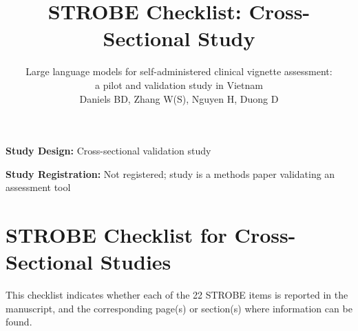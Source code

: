 \documentclass{article}
\title{STROBE Checklist: Cross-Sectional Study}
\author{
Large language models for self-administered clinical vignette assessment:\\
a pilot and validation study in Vietnam\\[12pt]
Daniels BD, Zhang W(S), Nguyen H, Duong D
}
\date{}
\begin{document}
\maketitle

\noindent \textbf{Study Design:} Cross-sectional validation study

\noindent \textbf{Study Registration:} Not registered; study is a methods paper validating an assessment tool

\vspace{12pt}

\section*{STROBE Checklist for Cross-Sectional Studies}

This checklist indicates whether each of the 22 STROBE items is reported in the manuscript, and the corresponding page(s) or section(s) where information can be found.

\vspace{12pt}
\end{document}
